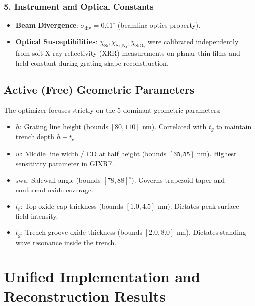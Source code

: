 \documentclass[11pt,a4paper]{article}
\begin{document}
\subsubsection{5. Instrument and Optical Constants}
\begin{itemize}
    \item \textbf{Beam Divergence}: $\sigma_{\mathrm{div}} = 0.01^\circ$ (beamline optics property).
    \item \textbf{Optical Susceptibilities}: $\chi_{\mathrm{Si}}, \chi_{\mathrm{Si}_3\mathrm{N}_4}, \chi_{\mathrm{SiO}_2}$ were calibrated independently from soft X-ray reflectivity (XRR) measurements on planar thin films and held constant during grating shape reconstruction.
\end{itemize}

\subsection{Active (Free) Geometric Parameters}
The optimizer focuses strictly on the 5 dominant geometric parameters:
\begin{itemize}
    \item $h$: Grating line height (bounds $[80, 110]\text{ nm}$). Correlated with $t_g$ to maintain trench depth $h - t_g$.
    \item $w$: Middle line width / CD at half height (bounds $[35, 55]\text{ nm}$). Highest sensitivity parameter in GIXRF.
    \item $\mathrm{swa}$: Sidewall angle (bounds $[78, 88]^\circ$). Governs trapezoid taper and conformal oxide coverage.
    \item $t_t$: Top oxide cap thickness (bounds $[1.0, 4.5]\text{ nm}$). Dictates peak surface field intensity.
    \item $t_g$: Trench groove oxide thickness (bounds $[2.0, 8.0]\text{ nm}$). Dictates standing wave resonance inside the trench.
\end{itemize}

\section{Unified Implementation and Reconstruction Results}
\end{document}
